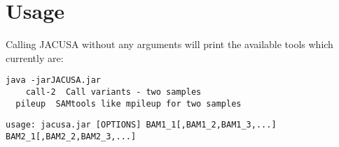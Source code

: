 \documentclass[10pt, a4paper]{article}
\begin{document}
\section{Usage}
Calling JACUSA without any arguments will print the available tools which currently are:
\begin{verbatim}
java -jarJACUSA.jar
	call-2  Call variants - two samples
  pileup  SAMtools like mpileup for two samples
\end{verbatim}

{\small
\begin{verbatim}
usage: jacusa.jar [OPTIONS] BAM1_1[,BAM1_2,BAM1_3,...] BAM2_1[,BAM2_2,BAM2_3,...]
\end{verbatim}}
\end{document}
